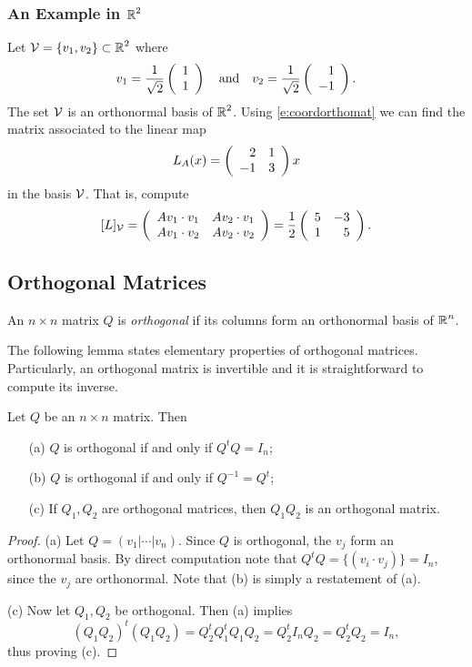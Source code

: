 \documentclass{ximera}
\begin{document}
\subsubsection{An Example in $\mbox{$\mathbb{R}$}^2$}

Let ${\cal V}=\{v_1,v_2\}\subset\mbox{$\mathbb{R}$}^2$ where
\[
v_1=\frac{1}{\sqrt{2}}\left(\begin{array}{r} 1 \\ 1\end{array}\right) \quad\mbox{and}\quad
v_2=\frac{1}{\sqrt{2}}\left(\begin{array}{r} 1 \\ -1\end{array}\right).
\]
The set ${\cal V}$ is an orthonormal basis of $\mbox{$\mathbb{R}$}^2$.  Using
\eqref{e:coordorthomat} we can find the matrix associated to the linear map
\[
L_A(x) = \left(\begin{array}{rr} 2 & 1\\ -1 &3\end{array}\right)x
\]
in the basis ${\cal V}$.  That is, compute
\[
[L]_{\cal V} =
\left(\begin{array}{rr} Av_1\cdot v_1 & Av_2\cdot v_1\\ Av_1\cdot v_2 &Av_2\cdot v_2\end{array}\right)
=\frac{1}{2}\left(\begin{array}{rr} 5 & -3\\ 1 &5\end{array}\right).
\]

\subsection*{Orthogonal Matrices}

\begin{definition} \label{def:orthmat}
An $n\times n$ matrix $Q$ is {\em orthogonal\/} if its columns form an
orthonormal basis
of $\mbox{$\mathbb{R}$}^n$.
\end{definition}



The following lemma states elementary properties of orthogonal matrices.  Particularly, 
an orthogonal matrix is invertible and it is straightforward to compute its inverse.
\begin{lemma} \label{lem:orthprop}
Let $Q$ be an $n\times n$ matrix.  Then
\begin{itemize}
\item[(a)] $Q$ is orthogonal if and only if $Q^tQ=I_n$;
\item[(b)] $Q$ is orthogonal if and only if $Q^{-1} = Q^t$;
\item[(c)] If $Q_1,Q_2$ are orthogonal matrices, then $Q_1Q_2$ is
an orthogonal matrix.
\end{itemize}
\end{lemma}
\begin{proof}  (a) Let $Q=(v_1|\cdots|v_n)$.  Since $Q$ is orthogonal, the $v_j$
form an orthonormal basis.  By direct computation note that
$Q^tQ=\{(v_i\cdot v_j)\}=I_n$, since the $v_j$ are orthonormal. Note that
(b) is simply a restatement of (a).

\noindent (c) Now let $Q_1,Q_2$ be orthogonal. Then (a) implies
\[
(Q_1Q_2)^t(Q_1Q_2) = Q_2^tQ_1^tQ_1Q_2 = Q_2^tI_nQ_2 = Q_2^tQ_2 = I_n,
\]
thus proving (c).  \end{proof}
\end{document}
